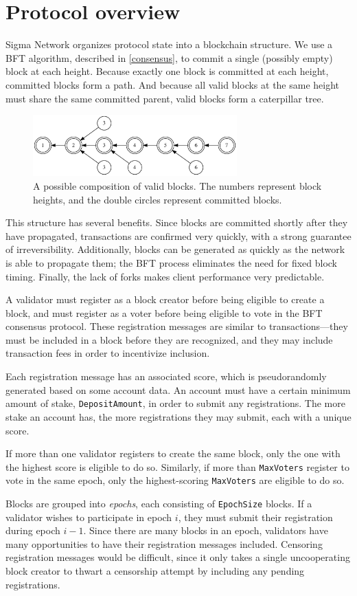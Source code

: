 \section{Protocol overview}
\label{protocol}

Sigma Network organizes protocol state into a blockchain structure. We use a BFT algorithm, described in \autoref{consensus}, to commit a single (possibly empty) block at each height. Because exactly one block is committed at each height, committed blocks form a path. And because all valid blocks at the same height must share the same committed parent, valid blocks form a caterpillar tree.

\begin{figure}[h]
  \centering
    \includegraphics[width=0.7\textwidth]{images/chain-structure}
  \caption{A possible composition of valid blocks. The numbers represent block heights, and the double circles represent committed blocks.}
\end{figure}

This structure has several benefits. Since blocks are committed shortly after they have propagated, transactions are confirmed very quickly, with a strong guarantee of irreversibility. Additionally, blocks can be generated as quickly as the network is able to propagate them; the BFT process eliminates the need for fixed block timing. Finally, the lack of forks makes client performance very predictable.

A validator must register as a block creator before being eligible to create a block, and must register as a voter before being eligible to vote in the BFT consensus protocol. These registration messages are similar to transactions---they must be included in a block before they are recognized, and they may include transaction fees in order to incentivize inclusion.

Each registration message has an associated score, which is pseudorandomly generated based on some account data. An account must have a certain minimum amount of stake, \texttt{DepositAmount}, in order to submit any registrations. The more stake an account has, the more registrations they may submit, each with a unique score.

If more than one validator registers to create the same block, only the one with the highest score is eligible to do so. Similarly, if more than \texttt{MaxVoters} register to vote in the same epoch, only the highest-scoring \texttt{MaxVoters} are eligible to do so.

Blocks are grouped into \emph{epochs}, each consisting of \texttt{EpochSize} blocks. If a validator wishes to participate in epoch $i$, they must submit their registration during epoch $i - 1$. Since there are many blocks in an epoch, validators have many opportunities to have their registration messages included. Censoring registration messages would be difficult, since it only takes a single uncooperating block creator to thwart a censorship attempt by including any pending registrations.
